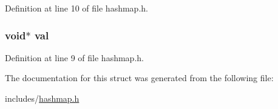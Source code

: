 Definition at line 10 of file hashmap.\+h.

\hypertarget{structhashmap__entry_ab03f36f103bdec81305fd301f1f93885}{
\subsubsection[{val}]{\setlength{\rightskip}{0pt plus 5cm}void$\ast$ val}}\label{structhashmap__entry_ab03f36f103bdec81305fd301f1f93885}


Definition at line 9 of file hashmap.\+h.



The documentation for this struct was generated from the following file\+:\begin{DoxyCompactItemize}
\item 
includes/\hyperlink{hashmap_8h}{hashmap.\+h}\end{DoxyCompactItemize}
